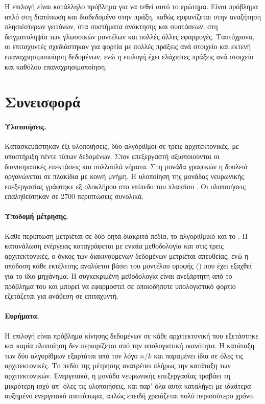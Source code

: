 Η επιλογή  είναι κατάλληλο πρόβλημα για να τεθεί αυτό το ερώτημα.
Είναι πρόβλημα απλό στη διατύπωση και διαδεδομένο στην πράξη, καθώς εμφανίζεται
στην αναζήτηση πλησιέστερων γειτόνων, στα συστήματα ανάκτησης και συστάσεων,
στη δειγματοληψία των γλωσσικών μοντέλων και πολλές άλλες εφαρμογές.
Ταυτόχρονα, οι επιταχυντές σχεδιάστηκαν για φορτία με πολλές πράξεις ανά
στοιχείο και εκτενή επαναχρησιμοποίηση δεδομένων, ενώ η επιλογή  έχει
ελάχιστες πράξεις ανά στοιχείο και καθόλου επαναχρησιμοποίηση.

\section{Συνεισφορά}
\label{sec:intro-contribution}

\paragraph{Υλοποιήσεις.} Κατασκευάστηκαν έξι υλοποιήσεις, δύο αλγόριθμοι σε
τρεις αρχιτεκτονικές, με υποστήριξη πέντε τύπων δεδομένων. Στον επεξεργαστή
αξιοποιούνται οι διανυσματικές επεκτάσεις  και πολλαπλά νήματα. Στη
μονάδα γραφικών η δουλειά οργανώνεται σε πλακίδια με κοινή μνήμη. Η υλοποίηση
της μονάδας νευρωνικής επεξεργασίας γράφτηκε εξ ολοκλήρου στο επίπεδο του
πλαισίου . Οι υλοποιήσεις επαληθεύτηκαν σε 2700 περιπτώσεις
συνολικά.

\paragraph{Υποδομή μέτρησης.} Κάθε περίπτωση μετριέται σε δύο ρητά διακριτά
πεδία, το αλγοριθμικό και το . Η κατανάλωση ενέργειας
καταγράφεται με ενιαία μεθοδολογία και στις τρεις αρχιτεκτονικές, ο όγκος των
διακινούμενων δεδομένων μετριέται απευθείας, ενώ η απόδοση κάθε εκτέλεσης
αναλύεται βάσει του μοντέλου οροφής () που έχει εξαχθεί για το
ίδιο μηχάνημα. Η συγκεκριμένη μεθοδολογία είναι ανεξάρτητη από το πρόβλημα του
 και μπορεί να εφαρμοστεί σε οποιοδήποτε υπολογιστικό φορτίο
εξετάζεται για ανάθεση σε επιταχυντή.

\paragraph{Ευρήματα.} Η επιλογή  είναι πρόβλημα κίνησης δεδομένων σε
κάθε αρχιτεκτονική που εξετάστηκε και καμία υλοποίηση δεν περιορίζεται από την
υπολογιστική ικανότητα. Η κατάταξη των δύο αλγορίθμων εξαρτάται από τον λόγο
$n/k$ και παραμένει ίδια σε όλες τις αρχιτεκτονικές. Το πεδίο της μέτρησης
ανατρέπει πλήρως την κατάταξη των αρχιτεκτονικών. Ενεργειακά, η μονάδα
νευρωνικής επεξεργασίας τραβάει τη μικρότερη ισχύ απ' όλες τις υλοποιήσεις, και
παρ' όλα αυτά καταλήγει με ιδιαίτερα αυξημένο ενεργειακό αποτύπωμα, απλώς
επειδή χρειάζεται πολύ περισσότερο χρόνο.

